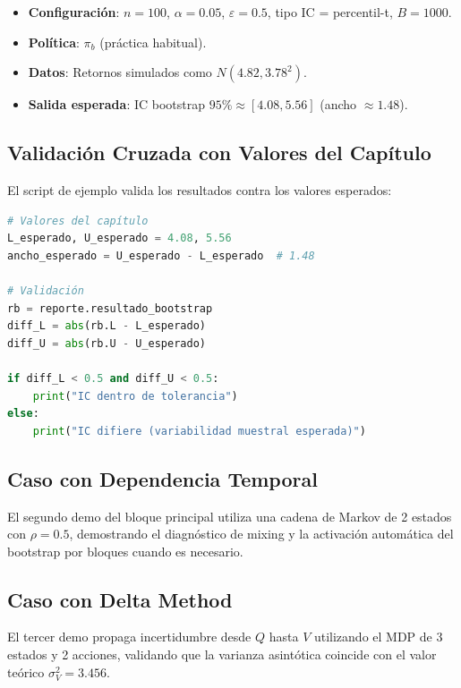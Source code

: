 \documentclass[12pt,a4paper]{article}
\begin{document}
\begin{itemize}
	\item \textbf{Configuración}: $n = 100$, $\alpha = 0.05$, $\varepsilon = 0.5$, tipo IC = percentil-t, $B = 1000$.
	\item \textbf{Política}: $\pi_b$ (práctica habitual).
	\item \textbf{Datos}: Retornos simulados como $N(4.82, 3.78^2)$.
	\item \textbf{Salida esperada}: IC bootstrap $95\% \approx [4.08, 5.56]$ (ancho $\approx 1.48$).
\end{itemize}

\subsection{Validación Cruzada con Valores del Capítulo}

El script de ejemplo valida los resultados contra los valores esperados:

\begin{lstlisting}[language=Python]
# Valores del capítulo
L_esperado, U_esperado = 4.08, 5.56
ancho_esperado = U_esperado - L_esperado  # 1.48

# Validación
rb = reporte.resultado_bootstrap
diff_L = abs(rb.L - L_esperado)
diff_U = abs(rb.U - U_esperado)

if diff_L < 0.5 and diff_U < 0.5:
    print("IC dentro de tolerancia")
else:
    print("IC difiere (variabilidad muestral esperada)")
\end{lstlisting}

\subsection{Caso con Dependencia Temporal}

El segundo demo del bloque principal utiliza una cadena de Markov de 2 estados con $\rho = 0.5$, demostrando el diagnóstico de mixing y la activación automática del bootstrap por bloques cuando es necesario.

\subsection{Caso con Delta Method}

El tercer demo propaga incertidumbre desde $Q$ hasta $V$ utilizando el MDP de 3 estados y 2 acciones, validando que la varianza asintótica coincide con el valor teórico $\sigma^2_V = 3.456$.

\end{document}
